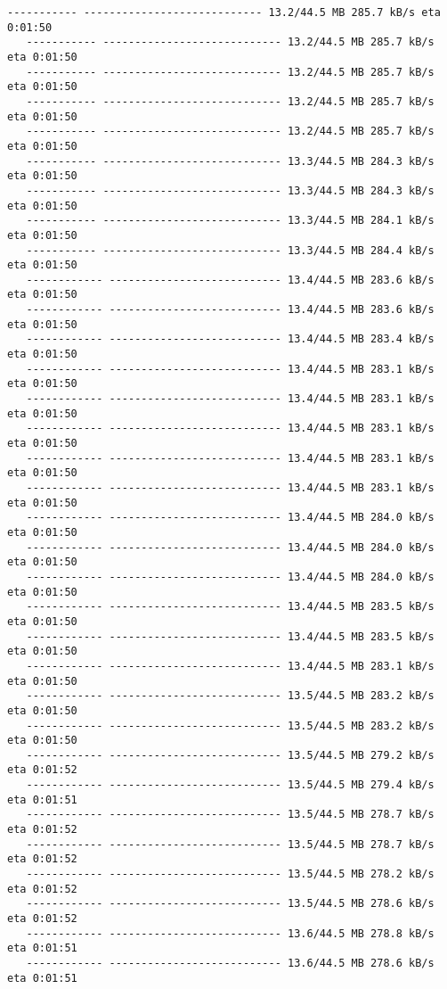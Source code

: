 \documentclass[11pt]{article}
\begin{document}
\begin{Verbatim}[commandchars=\\\{\}]
   ----------- ---------------------------- 13.2/44.5 MB 285.7 kB/s eta 0:01:50
   ----------- ---------------------------- 13.2/44.5 MB 285.7 kB/s eta 0:01:50
   ----------- ---------------------------- 13.2/44.5 MB 285.7 kB/s eta 0:01:50
   ----------- ---------------------------- 13.2/44.5 MB 285.7 kB/s eta 0:01:50
   ----------- ---------------------------- 13.2/44.5 MB 285.7 kB/s eta 0:01:50
   ----------- ---------------------------- 13.3/44.5 MB 284.3 kB/s eta 0:01:50
   ----------- ---------------------------- 13.3/44.5 MB 284.3 kB/s eta 0:01:50
   ----------- ---------------------------- 13.3/44.5 MB 284.1 kB/s eta 0:01:50
   ----------- ---------------------------- 13.3/44.5 MB 284.4 kB/s eta 0:01:50
   ------------ --------------------------- 13.4/44.5 MB 283.6 kB/s eta 0:01:50
   ------------ --------------------------- 13.4/44.5 MB 283.6 kB/s eta 0:01:50
   ------------ --------------------------- 13.4/44.5 MB 283.4 kB/s eta 0:01:50
   ------------ --------------------------- 13.4/44.5 MB 283.1 kB/s eta 0:01:50
   ------------ --------------------------- 13.4/44.5 MB 283.1 kB/s eta 0:01:50
   ------------ --------------------------- 13.4/44.5 MB 283.1 kB/s eta 0:01:50
   ------------ --------------------------- 13.4/44.5 MB 283.1 kB/s eta 0:01:50
   ------------ --------------------------- 13.4/44.5 MB 283.1 kB/s eta 0:01:50
   ------------ --------------------------- 13.4/44.5 MB 284.0 kB/s eta 0:01:50
   ------------ --------------------------- 13.4/44.5 MB 284.0 kB/s eta 0:01:50
   ------------ --------------------------- 13.4/44.5 MB 284.0 kB/s eta 0:01:50
   ------------ --------------------------- 13.4/44.5 MB 283.5 kB/s eta 0:01:50
   ------------ --------------------------- 13.4/44.5 MB 283.5 kB/s eta 0:01:50
   ------------ --------------------------- 13.4/44.5 MB 283.1 kB/s eta 0:01:50
   ------------ --------------------------- 13.5/44.5 MB 283.2 kB/s eta 0:01:50
   ------------ --------------------------- 13.5/44.5 MB 283.2 kB/s eta 0:01:50
   ------------ --------------------------- 13.5/44.5 MB 279.2 kB/s eta 0:01:52
   ------------ --------------------------- 13.5/44.5 MB 279.4 kB/s eta 0:01:51
   ------------ --------------------------- 13.5/44.5 MB 278.7 kB/s eta 0:01:52
   ------------ --------------------------- 13.5/44.5 MB 278.7 kB/s eta 0:01:52
   ------------ --------------------------- 13.5/44.5 MB 278.2 kB/s eta 0:01:52
   ------------ --------------------------- 13.5/44.5 MB 278.6 kB/s eta 0:01:52
   ------------ --------------------------- 13.6/44.5 MB 278.8 kB/s eta 0:01:51
   ------------ --------------------------- 13.6/44.5 MB 278.6 kB/s eta 0:01:51

\end{Verbatim}
\end{document}
